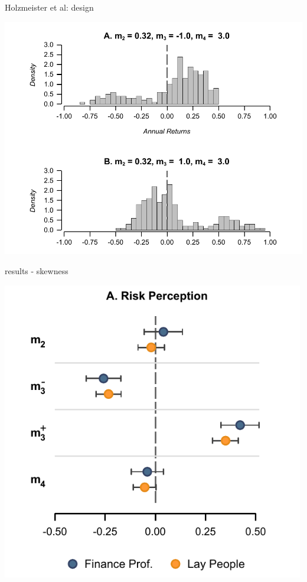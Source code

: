 \documentclass[
  ignorenonframetext,
]{beamer}
\begin{document}
\begin{frame}{Holzmeister et al: design}
\protect\hypertarget{holzmeister-et-al-design}{}

\includegraphics[width=6.5625in,height=\textheight]{hm_dist.png}

\end{frame}

\begin{frame}{results - skewness}
\protect\hypertarget{results---skewness}{}

\includegraphics[width=5.20833in,height=\textheight]{skew.png}

\end{frame}
\end{document}

